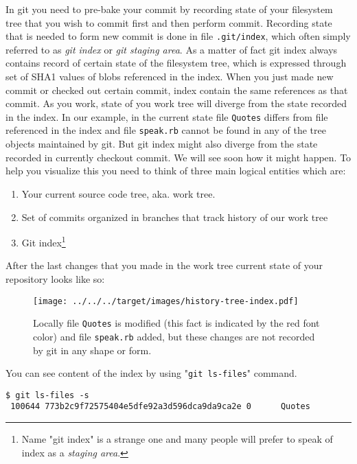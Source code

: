 \documentclass{article}
\theoremstyle{definition}
\begin{document}
        In git you need to pre-bake your commit by recording state of your filesystem tree that you wish to commit first
        and then perform commit. Recording state that is needed to form new commit is done in file \texttt{.git/index},
        which often simply referred to as {\em git index} or {\em git staging area}. As a matter of fact git index
        always contains record of certain state of the filesystem tree, which is expressed through set of SHA1 values of 
        blobs referenced in the index. When you just made new commit or checked out
        certain commit, index contain the same references as that commit. As you work, state of you work tree will diverge
        from the state recorded in the index. In our example, in the current state file \texttt{Quotes} differs from file
        referenced in the index and file \texttt{speak.rb} cannot be found in any of the tree objects maintained by git.
        But git index might also diverge from the state recorded in currently checkout commit. We will see soon how it
        might happen. To help you visualize this you need to think of three main logical entities which are:
        \begin{enumerate}
                \item Your current source code tree, aka. work tree.
                \item Set of commits organized in branches that track history of our work tree
                \item Git index\footnote{Name "git index" is a strange one and many people will prefer to speak of index as a {\em staging area}.}
        \end{enumerate}
        \newpage
        \noindent After the last changes that you made in the work tree current state of your repository looks like so:
        \begin{figure}[h]
        \centering\texttt{[image: ../../../target/images/history-tree-index.pdf]}
        \caption{Locally file \texttt{Quotes} is modified (this fact is indicated by the red font color) and file
          \texttt{speak.rb} added, but these changes are not recorded by git in any shape or form.\label{fig:history-tree-index}}
        \end{figure}

        \noindent You can see content of the index by using "\texttt{git ls-files}" command.

    \begin{Verbatim}[frame=single]
 $ git ls-files -s
 100644 773b2c9f72575404e5dfe92a3d596dca9da9ca2e 0      Quotes
        \end{Verbatim}
\end{document}
